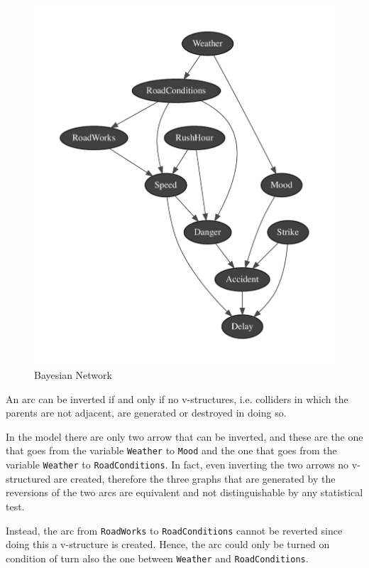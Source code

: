 \documentclass[a4paper,12pt]{article} %
\begin{document}
\begin{figure}[H]
	\centering
	\includegraphics[width=.9\linewidth]{../code/network.pdf}	
	\caption{Bayesian Network}
	\label{fig:net}
\end{figure}

An arc can be inverted if and only if no v-structures, i.e. colliders in which the parents are not adjacent, are generated or destroyed in doing so.
 
In the model there are only two arrow that can be inverted, and these are the one that goes from the variable \texttt{Weather} to \texttt{Mood} and the one that goes from the variable \texttt{Weather} to \texttt{RoadConditions}.
In fact, even inverting the two arrows no v-structured are created, therefore the three graphs that are generated by the reversions of the two arcs are equivalent and not distinguishable by any statistical test.

Instead, the arc from \texttt{RoadWorks} to \texttt{RoadConditions} cannot be reverted since doing this a v-structure is created. Hence, the arc could only be turned on condition of turn also the one between 
\texttt{Weather} and \texttt{RoadConditions}.
\end{document}
